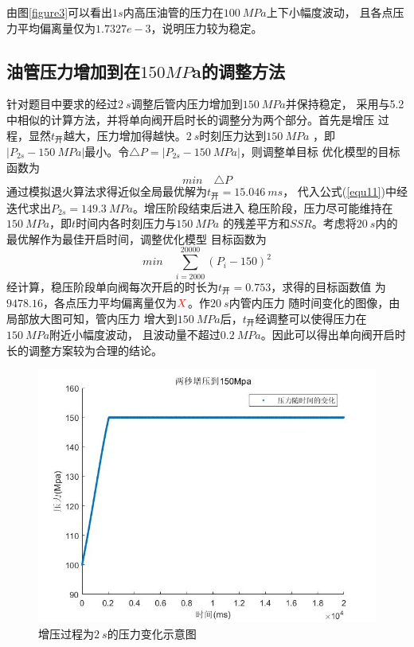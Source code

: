 \documentclass[withoutpreface,bwprint]{cumcmthesis} %
\begin{document}
    由图\ref{figure3}可以看出$1s$内高压油管的压力在$100~MPa$上下小幅度波动，
    且各点压力平均偏离量仅为$1.7327e-3$，说明压力较为稳定。

\subsection{油管压力增加到在$150MP$a的调整方法}
    针对题目中要求的经过$2~s$调整后管内压力增加到$150~MPa$并保持稳定，
    采用与5.2中相似的计算方法，并将单向阀开启时长的调整分为两个部分。首先是增压
    过程，显然$t_{\text{开}}$越大，压力增加得越快。$2~s$时刻压力达到$150~MPa$
    ，即$|P_{2s}-150~MPa|$最小。令$\triangle P=|P_{2s}-150~MPa|$，则调整单目标
    优化模型的目标函数为
    \begin{equation*}
        min \quad \triangle P
     \label{equ14}
     \end{equation*}
    通过模拟退火算法求得近似全局最优解为$t_{\text{开}}=15.046~ms$，
    代入公式(\ref{equ11})中经迭代求出$P_{2s}=149.3~MPa$。增压阶段结束后进入
    稳压阶段，压力尽可能维持在$150~MPa$，即$t$时间内各时刻压力与$150~MPa$
    的残差平方和$SSR$。考虑将$20~s$内的最优解作为最佳开启时间，调整优化模型
    目标函数为
    \begin{equation*}
        min \quad \sum\limits_{i=2000}^{20000} (P_i-150)^2
    \label{equ14}
    \end{equation*}
    经计算，稳压阶段单向阀每次开启的时长为$t_{\text{开}}=0.753$，求得的目标函数值
    为$9478.16$，各点压力平均偏离量仅为${\color{red}X}$。作$20~s$内管内压力
    随时间变化的图像，由局部放大图可知，管内压力
    增大到$150~MPa$后，$t_{\text{开}}$经调整可以使得压力在$150~MPa$附近小幅度波动，
    且波动量不超过$0.2~MPa$。因此可以得出单向阀开启时长的调整方案较为合理的结论。
    \begin{figure}[!h]
    \centering
    \includegraphics[width=.8\textwidth]{2s.jpg}
    \caption{增压过程为$2~s$的压力变化示意图}
    \label{figure4}
    \end{figure}
\end{document}
